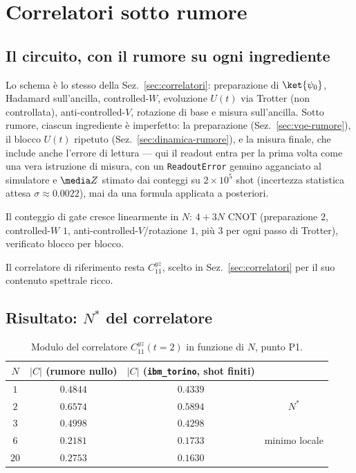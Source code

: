 \documentclass[11pt,a4paper]{article}
\begin{document}
\section{Correlatori sotto rumore}
\label{sec:correlatori-rumore}

\subsection{Il circuito, con il rumore su ogni ingrediente}

Lo schema è lo stesso della Sez.~\ref{sec:correlatori}: preparazione di
$\ket{\psi_0}$, Hadamard sull'ancilla, controlled-$W$, evoluzione $U(t)$
via Trotter (non controllata), anti-controlled-$V$, rotazione di base e
misura sull'ancilla. Sotto rumore, ciascun ingrediente è imperfetto: la
preparazione (Sez.~\ref{sec:vqe-rumore}), il blocco $U(t)$ ripetuto
(Sez.~\ref{sec:dinamica-rumore}), e la misura finale, che include anche
l'errore di lettura --- qui il readout entra per la prima volta come una
vera istruzione di misura, con un \texttt{ReadoutError} genuino agganciato
al simulatore e $\media Z$ stimato dai conteggi su $2\times10^5$ shot
(incertezza statistica attesa $\sigma\approx0.0022$), mai da una formula
applicata a posteriori.

Il conteggio di gate cresce linearmente in $N$: $4+3N$ CNOT (preparazione
$2$, controlled-$W$ $1$, anti-controlled-$V$/rotazione $1$, più $3$ per
ogni passo di Trotter), verificato blocco per blocco.

Il correlatore di riferimento resta $C_{11}^{yz}$, scelto in
Sez.~\ref{sec:correlatori} per il suo contenuto spettrale ricco.

\subsection{Risultato: $N^*$ del correlatore}

\begin{table}[htbp]
\centering
\renewcommand{\arraystretch}{1.15}
\small
\begin{tabular}{@{}cccc@{}}
\toprule
$N$ & $|C|$ (rumore nullo) & $|C|$ (\texttt{ibm\_torino}, shot finiti) & \\
\midrule
$1$ & $0.4844$ & $0.4339$ & \\
$2$ & $0.6574$ & $0.5894$ & $N^*$\\
$3$ & $0.4998$ & $0.4298$ & \\
$6$ & $0.2181$ & $0.1733$ & minimo locale\\
$20$ & $0.2753$ & $0.1630$ & \\
\bottomrule
\end{tabular}
\caption{Modulo del correlatore $C_{11}^{yz}(t{=}2)$ in funzione di $N$,
punto P1.}
\label{tab:C-N}
\end{table}
\end{document}
